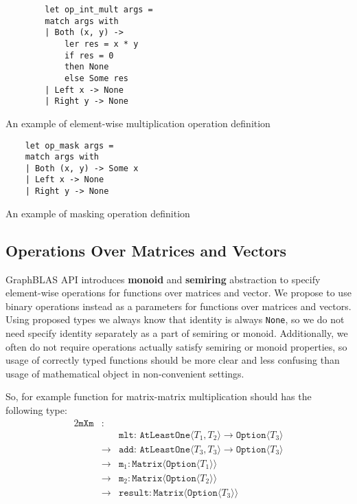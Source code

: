 \begin{listing}[h]
        \begin{verbatim}
        let op_int_mult args =
        match args with
        | Both (x, y) -> 
            ler res = x * y 
            if res = 0 
            then None 
            else Some res 
        | Left x -> None
        | Right y -> None
        \end{verbatim}
        \caption{An example of element-wise multiplication operation definition}
        \label{lst:opIntMult}
\end{listing}

\begin{listing}[h]
    \begin{verbatim}
    let op_mask args =
    match args with
    | Both (x, y) -> Some x
    | Left x -> None
    | Right y -> None
    \end{verbatim}
    \caption{An example of masking operation definition}
    \label{lst:opMask}
\end{listing}

\subsection{Operations Over Matrices and Vectors}

GraphBLAS API introduces \textbf{monoid} and \textbf{semiring} abstraction to specify element-wise operations for functions over matrices and vector.
We propose to use binary operations instead as a parameters for functions over matrices and vectors. 
Using proposed types we always know that identity is always \texttt{None}, so we do not need specify identity separately as a part of semiring or monoid.
Additionally, we often do not require operations actually satisfy semiring or monoid properties, so usage of correctly typed functions should be more clear and less confusing than usage of mathematical object in non-convenient settings.

So, for example function for matrix-matrix multiplication should has the following type:
\begin{alignat*}{2}
    \texttt{mXm} & : & \\ 
        &   & \texttt{mlt: AtLeastOne} \langle T_1, T_2 \rangle \to \texttt{Option} \langle T_3 \rangle \\
        & \to & \texttt{add: AtLeastOne} \langle T_3, T_3 \rangle \to \texttt{Option} \langle T_3 \rangle \\
        & \to & \texttt{m}_1: \texttt{Matrix} \langle \texttt{Option} \langle T_1\rangle \rangle \\
        & \to & \texttt{m}_2: \texttt{Matrix} \langle \texttt{Option} \langle T_2 \rangle \rangle \\
        & \to & \texttt{result}: \texttt{Matrix} \langle \texttt{Option} \langle T_3\rangle \rangle
\end{alignat*}

